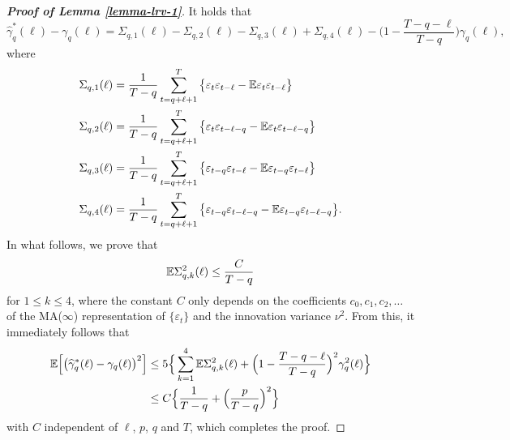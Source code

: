 \begin{proof}[\textnormal{\textbf{Proof of Lemma \ref{lemma-lrv-1}}}] 
It holds that
\[ \widehat{\gamma}_q^*(\ell) - \gamma_q(\ell) = \Sigma_{q,1}(\ell) - \Sigma_{q,2}(\ell) - \Sigma_{q,3}(\ell) + \Sigma_{q,4}(\ell) - \Big(1 - \frac{T-q-\ell}{T-q}\Big) \gamma_q(\ell), \]
where
\begin{align*}
\Sigma_{q,1}(\ell) & = \frac{1}{T-q} \sum_{t=q+\ell+1}^T \big\{ \varepsilon_t \varepsilon_{t-\ell} - \mathbb{E} \varepsilon_t \varepsilon_{t-\ell} \big\} \\
\Sigma_{q,2}(\ell) & = \frac{1}{T-q} \sum_{t=q+\ell+1}^T \big\{ \varepsilon_t \varepsilon_{t-\ell-q} - \mathbb{E} \varepsilon_t \varepsilon_{t-\ell-q} \big\} \\
\Sigma_{q,3}(\ell) & = \frac{1}{T-q} \sum_{t=q+\ell+1}^T \big\{ \varepsilon_{t-q} \varepsilon_{t-\ell} - \mathbb{E} \varepsilon_{t-q} \varepsilon_{t-\ell} \big\} \\
\Sigma_{q,4}(\ell) & = \frac{1}{T-q} \sum_{t=q+\ell+1}^T \big\{ \varepsilon_{t-q} \varepsilon_{t-\ell-q} - \mathbb{E} \varepsilon_{t-q} \varepsilon_{t-\ell-q} \big\}. 
\end{align*}
In what follows, we prove that 
\begin{equation}\label{eq1-lemma-lrv-1}
\mathbb{E} \Sigma_{q,k}^2(\ell) \le \frac{C}{T-q} 
\end{equation}
for $1 \le k \le 4$, where the constant $C$ only depends on the coefficients $c_0,c_1,c_2,\ldots$ of the MA($\infty$) representation of $\{\varepsilon_t\}$ and the innovation variance $\nu^2$. From this, it immediately follows that 
\begin{align*}
\mathbb{E} \Big[ \big( \widehat{\gamma}_q^*(\ell) - \gamma_q(\ell) \big)^2 \Big] 
 & \le 5 \Big\{ \sum_{k=1}^4 \mathbb{E} \Sigma_{q,k}^2(\ell) + \Big(1 - \frac{T-q-\ell}{T-q}\Big)^2 \gamma_q^2(\ell) \Big\} \\
 & \le C \Big\{ \frac{1}{T-q} + \Big(\frac{p}{T-q}\Big)^2 \Big\} 
\end{align*}
with $C$ independent of $\ell$, $p$, $q$ and $T$, which completes the proof. 



\end{proof}
